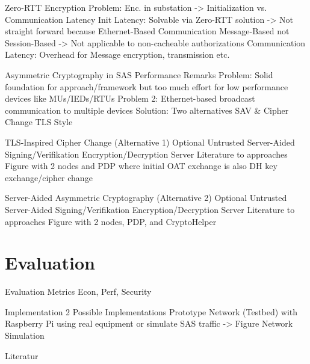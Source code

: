 \documentclass[en]{sdqbeamer}
\begin{document}
\begin{frame}{Zero-RTT Encryption}
    Problem: Enc. in substation -> Initialization vs. Communication Latency
    Init Latency: Solvable via Zero-RTT solution -> Not straight forward because Ethernet-Based Communication Message-Based not Session-Based
    -> Not applicable to non-cacheable authorizations
    Communication Latency: Overhead for Message encryption, transmission etc.
\end{frame}

\begin{frame}{Asymmetric Cryptography in SAS}
    Performance Remarks
    Problem: Solid foundation for approach/framework but too much effort for low performance devices like MUs/IEDs/RTUs
    Problem 2: Ethernet-based broadcast communication to multiple devices
    Solution: Two alternatives SAV \& Cipher Change TLS Style
\end{frame}

\begin{frame}{TLS-Inspired Cipher Change (Alternative 1)}
    Optional Untrusted Server-Aided Signing/Verifikation Encryption/Decryption Server
    Literature to approaches
    Figure with 2 nodes and PDP where initial OAT exchange is also DH key exchange/cipher change
\end{frame}

\begin{frame}{Server-Aided Asymmetric Cryptography (Alternative 2)}
    Optional Untrusted Server-Aided Signing/Verifikation Encryption/Decryption Server
    Literature to approaches
    Figure with 2 nodes, PDP, and CryptoHelper
\end{frame}

\section{Evaluation}
\begin{frame}{Evaluation Metrics}
    Econ, Perf, Security
\end{frame}

\begin{frame}{Implementation}
    2 Possible Implementations
    Prototype Network (Testbed) with Raspberry Pi using real equipment or simulate SAS traffic -> Figure
    Network Simulation
\end{frame}

\appendix
\beginbackup

\begin{frame}{Literatur}
\printbibliography
\end{frame}

\backupend
\end{document}
